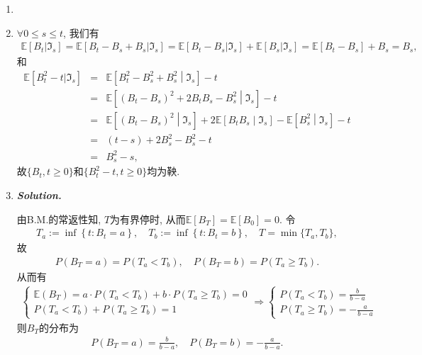 \documentclass{article}
\makeatletter
\newtheorem*{Solution}{\itshape Solution}
\renewenvironment{Solution}[1][\itshape Solution.]{%
  \par\noindent\textbf{#1}\quad\CJKfamily{SimSun}%
}{\par}
\renewenvironment{proof}[1][\proofname]{\par
  \pushQED{\qed}%
  \normalfont \topsep6\p@\@plus6\p@\relax
  \trivlist
  \item[\hskip\labelsep
        \bfseries\itshape
    #1\@addpunct{.}]\ignorespaces
}{%
  \popQED\endtrivlist\@endpefalse
}
\makeatother
\begin{document}
    \begin{enumerate}[label=(\arabic*)]
    \item \begin{proof}
      $\forall 0\le s\le t$, 我们有
      \begin{eqnarray*}
        \mathbb{E}\left[B_t|\mathfrak{I}_s\right] 
        = \mathbb{E}\left[B_t-B_s +B_s|\mathfrak{I}_s\right]
        = \mathbb{E}\left[B_t-B_s|\mathfrak{I}_s\right]+\mathbb{E}\left[B_s|\mathfrak{I}_s\right] 
        = \mathbb{E}\left[B_t-B_s\right]+B_s 
        = B_s,
      \end{eqnarray*}
  和
  \begin{eqnarray*}
    \mathbb{E}\left[B_t^2 - t|\mathfrak{I}_s\right]& = &\mathbb{E}\left[B_t^2-B_s^2 +B_s^2\middle|\mathfrak{I}_s\right] - t\\
    & = &\mathbb{E}\left[\left(B_t-B_s\right)^2+2B_tB_s - B_s^2\middle|\mathfrak{I}_s\right] - t \\
    & = &\mathbb{E}\left[\left(B_t-B_s\right)^2\middle|\mathfrak{I}_s\right]+2\mathbb{E}\left[B_tB_s\middle|\mathfrak{I}_s\right]-\mathbb{E}\left[B_s^2\middle|\mathfrak{I}_s\right] - t\\
    & = & (t -s) +2B_s^2 - B_s^2 - t \\
    & = & B_s^2 -s,
  \end{eqnarray*}
  故$\{B_t,t\ge 0\}$和$\{B_t^2 - t,t\ge 0\}$均为鞅.
    \end{proof}
    \item 
  \begin{Solution}
     由B.M.的常返性知, $T$为有界停时, 从而$\mathbb{E}\left[B_T\right]=\mathbb{E}\left[B_0\right]=0$. 令
  \begin{eqnarray*}
    T_a := \inf\left\{t:B_t =a\right\},\quad T_b := \inf\left\{t:B_t =b\right\},\quad  T = \min\{T_a,T_b\},
  \end{eqnarray*}
  故
  \begin{eqnarray*}
    P\left(B_T = a\right) = P\left(T_a < T_b\right),\quad  P\left(B_T = b\right) = P\left(T_a \ge T_b\right).
  \end{eqnarray*}
  从而有
  \begin{eqnarray*}
    \left\{\begin{array} { l } 
      { \mathbb{E} ( B_T ) = a \cdot P (T _ {a} < T _ {b} ) + b \cdot P (T _ {a} \geqslant T _ {b} ) = 0 } \\
      { P (T _ {a} < T _ { b } ) + P ( T _ {a} \geqslant T _ { b } ) = 1 }
      \end{array} \Rightarrow \left\{\begin{array}{l}
      P\left(T_a<T_b\right)=\frac{b}{b-a} \\
      P\left(T_a \geqslant T_b\right)=-\frac{a}{b-a}
      \end{array}\right.\right.
  \end{eqnarray*}
  则$B_T$的分布为
  \begin{eqnarray*}
    P\left(B_T = a\right) = \frac{b}{b-a} ,\quad  P\left(B_T = b\right) = -\frac{a}{b-a}.
  \end{eqnarray*}
    \end{Solution}
  

\end{enumerate}
\end{document}
